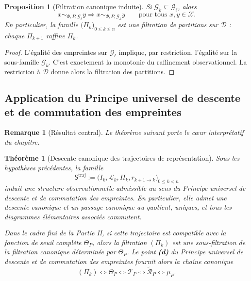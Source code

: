 \documentclass[11pt,a4paper]{article}
\newtheorem{proposition}{Proposition}
\newtheorem{theorem}{Théorème}
\newtheorem{remark}{Remarque}
\begin{document}
\begin{appendices}
\begin{proposition}[Filtration canonique induite]
Si \(\mathcal G_k\subseteq \mathcal G_\ell\), alors
\[
x\sim_{\Phi,P,\mathcal G_\ell}y \Longrightarrow x\sim_{\Phi,P,\mathcal G_k}y
\qquad \text{pour tous }x,y\in\mathcal X.
\]
En particulier, la famille \(\bigl(\Pi_k\bigr)_{0\le k\le n}\) est une filtration de partitions sur \(\mathcal D\) : chaque \(\Pi_{k+1}\) raffine \(\Pi_k\).
\end{proposition}

\begin{proof}
L'égalité des empreintes sur \(\mathcal G_\ell\) implique, par restriction, l'égalité sur la sous-famille \(\mathcal G_k\). C'est exactement la monotonie du raffinement observationnel. La restriction à \(\mathcal D\) donne alors la filtration des partitions.
\end{proof}

\subsection{Application du Principe universel de descente et de commutation des empreintes}

\begin{remark}[Résultat central]
Le théorème suivant porte le cœur interprétatif du chapitre.
\end{remark}

\begin{theorem}[Descente canonique des trajectoires de représentation]
\label{thm:descente-trajectoire}
Sous les hypothèses précédentes, la famille
\[
\mathsf S^{\mathrm{traj}}
:=
\bigl(I_k,\mathcal L_k,\Pi_k,r_{k+1\to k}\bigr)_{0\le k<n}
\]
induit une structure observationnelle admissible au sens du \emph{Principe universel de descente et de commutation des empreintes}. En particulier, elle admet une descente canonique et un passage canonique au quotient, uniques, et tous les diagrammes élémentaires associés commutent.

Dans le cadre fini de la Partie II, si cette trajectoire est compatible avec la fonction de seuil complète \(\Theta_P\), alors la filtration \((\Pi_k)\) est une sous-filtration de la filtration canonique déterminée par \(\Theta_P\). Le point \textbf{(d)} du \emph{Principe universel de descente et de commutation des empreintes} fournit alors la chaîne canonique
\[
(\Pi_k)\Longleftrightarrow \Theta_P \Longleftrightarrow \mathcal T_P \Longleftrightarrow \widetilde{\mathcal R}_P \Longleftrightarrow \mu_P.
\]
\end{theorem}


\end{appendices}
\end{document}
